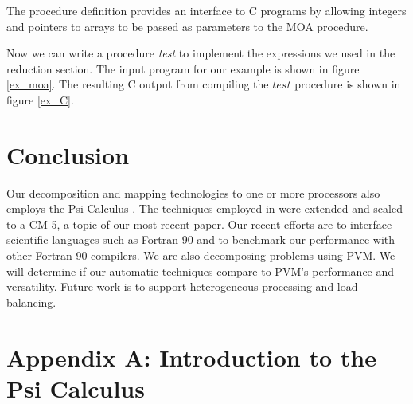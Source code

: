The procedure definition provides an interface to C programs by allowing
integers and pointers to arrays to be passed as parameters to the MOA 
procedure.
 
Now we can write a procedure {\it test} to implement the expressions we used
in the reduction section.  The input program for our example is shown in
figure \ref{ex_moa}.  The resulting C output from compiling the $test$ 
procedure is shown in figure \ref{ex_C}.


\section*{Conclusion}
Our decomposition and mapping technologies to one or more processors also
employs the Psi Calculus \cite{mdst92,mdst93,mdst94}.  
The techniques employed in 
\cite{mdst93} were extended and scaled to a CM-5, a topic of our most
recent  paper\cite{mdst94}.  
Our recent efforts are to interface scientific languages such as
Fortran 90 and to benchmark our performance with other Fortran 90 compilers.
We are also decomposing problems using PVM.  We will determine if our
automatic techniques compare to PVM's performance and versatility.  Future
work is to support heterogeneous processing and load balancing.
 
\clearpage




\clearpage
\appendix

\section*{Appendix A: Introduction to the Psi Calculus}

